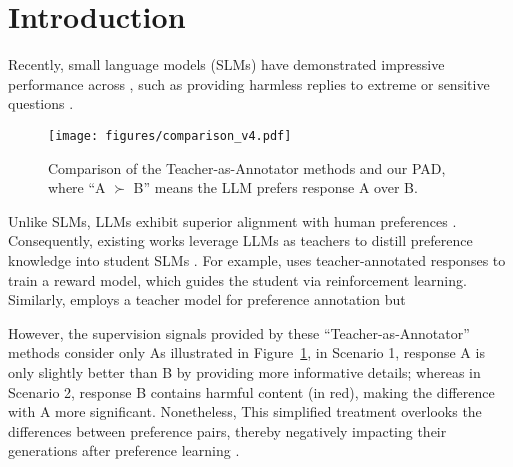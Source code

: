 
\section{Introduction}

Recently, small language models (SLMs) have demonstrated impressive performance across , such as providing harmless replies to extreme or sensitive questions \citep{tunstall-2024-zephyr}.

\begin{figure}[!t]
    \centering
    \texttt{[image: figures/comparison\_v4.pdf]}
    \vspace{-7mm}
    \caption{Comparison of the Teacher-as-Annotator methods and our PAD, where ``A $\succ$ B'' means the LLM prefers response A over B. }
    \label{fig:cmp}
    \vspace{-5mm}
\end{figure}

Unlike SLMs, LLMs exhibit superior alignment with human preferences \citep{openai-2024-gpt4technicalreport, geminiteam2024gemini15unlockingmultimodal}. Consequently, existing works leverage LLMs as teachers to distill preference knowledge into student SLMs \citep{bai-2022-constitutional, cui2023ultrafeedback, tunstall-2024-zephyr, wang-2024-rlvlmf, yuan-2024-selfreward}. 
For example, \citet{bai-2022-constitutional} uses teacher-annotated responses to train a reward model, which guides the student via reinforcement learning. Similarly, \citet{tunstall-2024-zephyr} employs a teacher model for preference annotation but 
 
However, the supervision signals provided by these ``Teacher-as-Annotator'' methods consider only 
As illustrated in Figure~\ref{fig:cmp}, in Scenario 1, response A is only slightly better than B by providing more informative details; whereas in Scenario 2, response B contains harmful content (in red), making the difference with A more significant. 
Nonetheless, 
This simplified treatment overlooks the differences between preference pairs, thereby negatively impacting their generations after preference learning \citep{amini-etal-2024-direct}. 


